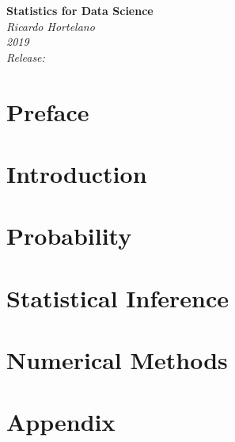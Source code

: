 \documentclass[12pt]{book}
\begin{document}
\begin{titlepage}
    \begin{center}
       \Large\textbf{Statistics for Data Science}\\
       \large\textit{Ricardo Hortelano}\\
       \textit{2019}\\
       \vspace*{3\baselineskip}
       \textit{Release:}\\
       \textit{}
    \end{center}
 \end{titlepage}

\tableofcontents

\chapter*{Preface}


\chapter{Introduction}


\chapter{Probability}


\chapter{Statistical Inference}


\chapter{Numerical Methods}


\appendix
\chapter{Appendix}


\printbibliography
\end{document}
